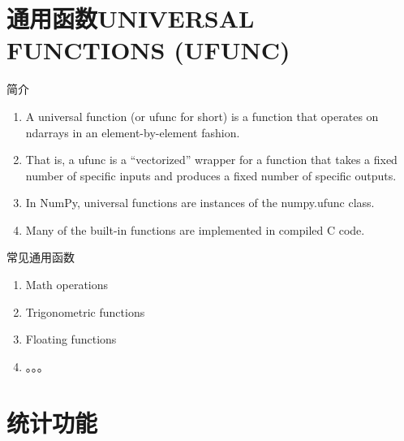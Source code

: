 \documentclass[ignorenonframetext,11pt,xcolor=dvipsnames,hyperref={colorlinks,allcolors=.,urlcolor=blue, citecolor=violet, bookmarksdepth=4},aspectratio=1610]{beamer}
\providecommand{\tightlist}{%
  \setlength{\itemsep}{0pt}\setlength{\parskip}{0pt}}
\begin{document}
\hypertarget{universal-functions-ufunc}{%
\section{通用函数UNIVERSAL FUNCTIONS
(UFUNC)}\label{universal-functions-ufunc}}

\begin{frame}{简介}
\protect\hypertarget{section-1}{}

\begin{enumerate}
\tightlist
\item
  A universal function (or ufunc for short) is a function that operates
  on ndarrays in an element-by-element fashion.
\item
  That is, a ufunc is a ``vectorized'' wrapper for a function that takes
  a fixed number of specific inputs and produces a fixed number of
  specific outputs.
\item
  In NumPy, universal functions are instances of the numpy.ufunc class.
\item
  Many of the built-in functions are implemented in compiled C code.
\end{enumerate}

\end{frame}

\begin{frame}{常见通用函数}
\protect\hypertarget{section-2}{}

\begin{enumerate}
\tightlist
\item
  Math operations
\item
  Trigonometric functions
\item
  Floating functions
\item
  。。。
\end{enumerate}

\end{frame}

\hypertarget{section-3}{%
\section{统计功能}\label{section-3}}
\end{document}
